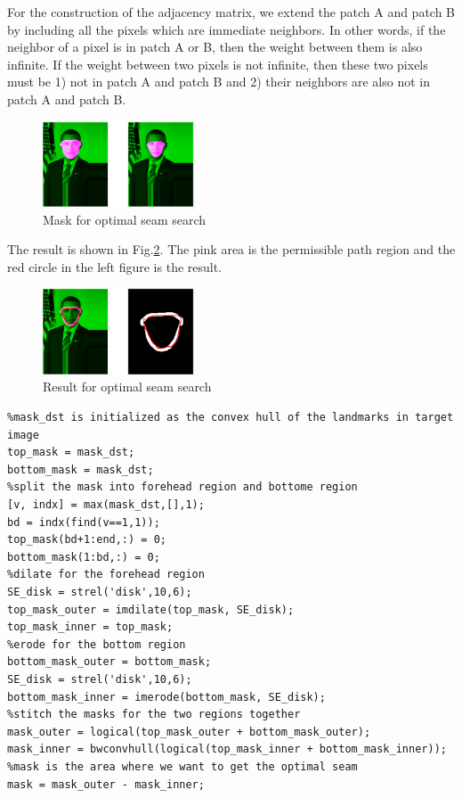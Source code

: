 \documentclass[10pt,twocolumn,letterpaper]{article}
\begin{document}
For the construction of the adjacency matrix, we extend the patch A and patch B by including all the pixels which are immediate neighbors. In other words, if the neighbor of a pixel is in patch A or B, then the weight between them is also infinite. If the weight between two pixels is not infinite, then these two pixels must be 1) not in patch A and patch B and 2) their neighbors are also not in patch A and patch B.

\begin{figure}[hb]
  \centering
  \includegraphics[width=0.4\textwidth]{seam_mask.eps}
  \caption{Mask for optimal seam search}\label{seam-mask}
\end{figure}

The result is shown in Fig.\ref{seam-result}. The pink area is the permissible path region and the red circle in the left figure is the result.

\begin{figure}[hb]
  \centering
  \includegraphics[width=0.4\textwidth]{seam_result.eps}
  \caption{Result for optimal seam search}\label{seam-result}
\end{figure}

\begin{lstlisting}
%mask_dst is initialized as the convex hull of the landmarks in target image
top_mask = mask_dst;
bottom_mask = mask_dst;
%split the mask into forehead region and bottome region
[v, indx] = max(mask_dst,[],1);
bd = indx(find(v==1,1));
top_mask(bd+1:end,:) = 0;
bottom_mask(1:bd,:) = 0;
%dilate for the forehead region
SE_disk = strel('disk',10,6);
top_mask_outer = imdilate(top_mask, SE_disk);
top_mask_inner = top_mask;
%erode for the bottom region
bottom_mask_outer = bottom_mask;
SE_disk = strel('disk',10,6);
bottom_mask_inner = imerode(bottom_mask, SE_disk);
%stitch the masks for the two regions together
mask_outer = logical(top_mask_outer + bottom_mask_outer);
mask_inner = bwconvhull(logical(top_mask_inner + bottom_mask_inner));
%mask is the area where we want to get the optimal seam
mask = mask_outer - mask_inner;
\end{lstlisting}
\end{document}
